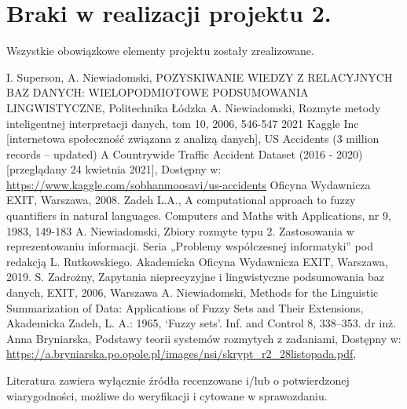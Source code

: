 \documentclass{classrep}
\begin{document}
\section{Braki w realizacji projektu 2.}
Wszystkie obowiązkowe elementy projektu zostały zrealizowane.



\begin{thebibliography}{99}
 I. Superson, A. Niewiadomski, POZYSKIWANIE WIEDZY Z RELACYJNYCH BAZ DANYCH: WIELOPODMIOTOWE PODSUMOWANIA LINGWISTYCZNE, Politechnika Łódzka
 A. Niewiadomski, Rozmyte metody inteligentnej interpretacji danych, tom 10, 2006, 546-547
 2021 Kaggle Inc [internetowa społeczność związana z analizą danych], US Accidents (3 million records -- updated)
A Countrywide Traffic Accident Dataset (2016 - 2020) [przeglądany 24 kwietnia 2021], Dostępny w: \url{https://www.kaggle.com/sobhanmoosavi/us-accidents}
Oficyna Wydawnicza EXIT, Warszawa, 2008.
 Zadeh L.A., A computational approach to fuzzy quantifiers in natural languages. Computers and Maths with Applications, nr 9, 1983, 149-183
  A. Niewiadomski, Zbiory rozmyte typu 2. Zastosowania w reprezentowaniu informacji.  Seria „Problemy współczesnej informatyki” pod redakcją L. Rutkowskiego. Akademicka Oficyna Wydawnicza EXIT, Warszawa, 2019.
 S. Zadrożny, Zapytania nieprecyzyjne i lingwistyczne podsumowania baz danych, EXIT, 2006, Warszawa
 A. Niewiadomski, Methods for the Linguistic Summarization of Data: Applications of Fuzzy Sets and Their Extensions, Akademicka 
 Zadeh, L. A.: 1965, ‘Fuzzy sets’. Inf. and Control 8, 338–353.
 dr inż. Anna Bryniarska, Podstawy teorii systemów rozmytych z zadaniami, Dostępny w: \url{https://a.bryniarska.po.opole.pl/images/nsi/skrypt_r2_28listopada.pdf},
\end{thebibliography}

Literatura zawiera wyłącznie źródła recenzowane i/lub o potwierdzonej wiarygodności,
możliwe do weryfikacji i cytowane w sprawozdaniu. 
\end{document}
